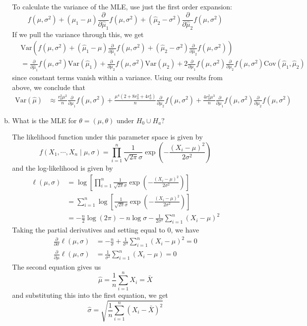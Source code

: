 \documentclass{article}
\newcommand{\var}{\mathrm{Var}}
\newcommand{\cov}{\mathrm{Cov}}
\begin{document}
\begin{itemize}
\begin{enumerate}[(a)]
\begin{soln}
					To calculate the variance of the MLE, use just the first order expansion: \[f(\mu, \sigma^2) + (\hat\mu_1-\mu)\frac{\partial}{\partial\hat\mu_1}f(\mu, \sigma^2) + (\hat\mu_2-\sigma^2)\frac{\partial}{\partial\hat\mu_2}f(\mu, \sigma^2)\] If we pull the variance through this, we get 
					\begin{align*}
						&\var\left( f(\mu, \sigma^2) + (\hat\mu_1-\mu)\frac{\partial}{\partial\hat\mu_1}f(\mu, \sigma^2) + (\hat\mu_2-\sigma^2)\frac{\partial}{\partial\hat\mu_2}f(\mu, \sigma^2) \right) \\
						&= \frac{\partial}{\partial\hat\mu_1}f(\mu, \sigma^2) \var(\hat\mu_1) + \frac{\partial}{\partial\mu_2}f(\mu, \sigma^2) \var(\hat\mu_2) + 2\frac{\partial}{\partial\mu_1}f(\mu, \sigma^2)\frac{\partial}{\partial\mu_2}f(\mu, \sigma^2) \cov(\hat\mu_1, \hat\mu_2)
					\end{align*}
					since constant terms vanish within a variance. Using our results from above, we conclude that 
					\begin{align*}
						\var(\hat\mu) &\approx \frac{r_0^2\mu^2}{n}\frac{\partial}{\partial\mu_1}f(\mu, \sigma^2) + \frac{\mu^4(2+8r_0^2+4r_0^4)}{n} \frac{\partial}{\partial\mu_2}f(\mu, \sigma^2) + \frac{4r_0^2\mu^3}{n}\frac{\partial}{\partial\mu_1}f(\mu, \sigma^2)\frac{\partial}{\partial\mu_2}f(\mu, \sigma^2)
					\end{align*}
				\end{soln}

			\item What is the MLE for $\theta=(\mu, \theta)$ under $H_0\cup H_a?$
				\begin{soln}
					The likelihood function under this parameter space is given by \[f(X_1, \cdots, X_n\mid \mu, \sigma) = \prod_{i=1}^{n} \frac{1}{\sqrt{2\pi}\sigma}\exp\left( -\frac{(X_i-\mu)^2}{2\sigma^2} \right)\] and the log-likelihood is given by 
					\begin{align*}
						\ell(\mu, \sigma) &= \log\left[ \prod_{i=1}^{n} \frac{1}{\sqrt{2\pi}\sigma}\exp\left( -\frac{(X_i-\mu)^2}{2\sigma^2} \right) \right]  \\
						&= \sum_{i=1}^{n} \log \left[ \frac{1}{\sqrt{2\pi}\sigma}\exp\left( -\frac{(X_i-\mu)^2}{2\sigma^2} \right) \right]  \\
						&= -\frac{n}{2}\log(2\pi) - n\log \sigma - \frac{1}{2\sigma^2}\sum_{i=1}^{n}(X_i-\mu)^2
					\end{align*}
					Taking the partial derivatives and setting equal to 0, we have
					\begin{align*}
						\frac{\partial}{\partial\sigma} \ell(\mu, \sigma) &= -\frac{n}{\sigma} + \frac{1}{\sigma^3}\sum_{i=1}^{n} (X_i-\mu)^2 = 0 \\
						\frac{\partial}{\partial\mu} \ell(\mu, \sigma) &= \frac{1}{\sigma^2}\sum_{i=1}^{n} (X_i-\mu) = 0
					\end{align*}
					The second equation gives us \[\hat{\mu} = \frac{1}{n}\sum_{i=1}^{n} X_i = \bar{X}\] and substituting this into the first equation, we get \[\hat\sigma = \sqrt{\frac{1}{n} \sum_{i=1}^{n} (X_i-\bar{X})^2}\]


\end{soln}
\end{enumerate}
\end{itemize}
\end{document}
